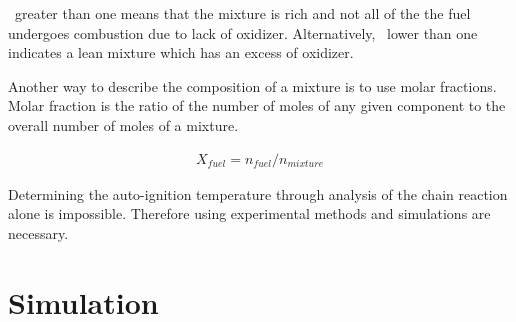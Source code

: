 \documentclass[a4paper]{article}[11pt]
\begin{document}
      \textphi \ greater than one means that the mixture is rich and not all of the the fuel undergoes combustion due to lack of oxidizer. Alternatively, \textphi \ lower than one indicates a lean mixture which has an excess of oxidizer. \par 
      Another way to describe the composition of a mixture is to use molar fractions. Molar fraction is the ratio of the number of moles of any given component to the overall number of moles of a mixture. \par 
      
      \begin{gather*}
    X_{fuel} = n_{fuel}/n_{mixture}
     \end{gather*}
     
     Determining the auto-ignition temperature through analysis of the chain reaction alone is impossible. Therefore using experimental methods and simulations are necessary.
     
    \section{Simulation}
    
\end{document}
